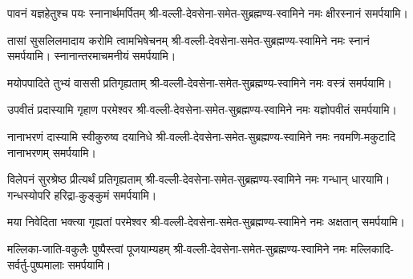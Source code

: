 \begin{center}
{पावनं यज्ञहेतुश्च पयः स्नानार्थमर्पितम्}
\nobreak%
श्री-वल्ली-देवसेना-समेत-सुब्रह्मण्य-स्वामिने
नमः क्षीरस्नानं समर्पयामि।

{तासां सुसलिलमादाय करोमि त्वामभिषेचनम्}
\nobreak%
श्री-वल्ली-देवसेना-समेत-सुब्रह्मण्य-स्वामिने
नमः स्नानं समर्पयामि। स्नानान्तरमाचमनीयं समर्पयामि।

{मयोपपादिते तुभ्यं वाससी प्रतिगृह्यताम्}
\nobreak%
श्री-वल्ली-देवसेना-समेत-सुब्रह्मण्य-स्वामिने
नमः वस्त्रं समर्पयामि।

{उपवीतं प्रदास्यामि गृहाण परमेश्वर}
\nobreak%
श्री-वल्ली-देवसेना-समेत-सुब्रह्मण्य-स्वामिने
नमः यज्ञोपवीतं समर्पयामि।

{नानाभरणं दास्यामि स्वीकुरुष्व दयानिधे}
\nobreak%
श्री-वल्ली-देवसेना-समेत-सुब्रह्मण्य-स्वामिने
नमः नवमणि-मकुटादि नानाभरणम् समर्पयामि।

{विलेपनं सुरश्रेष्ठ प्रीत्यर्थं प्रतिगृह्यताम्}
\nobreak%
श्री-वल्ली-देवसेना-समेत-सुब्रह्मण्य-स्वामिने
नमः गन्धान् धारयामि। गन्धस्योपरि हरिद्रा-कुङ्कुमं समर्पयामि।


{मया निवेदिता भक्त्या गृह्यतां परमेश्वर}
\nobreak%
श्री-वल्ली-देवसेना-समेत-सुब्रह्मण्य-स्वामिने
नमः अक्षतान् समर्पयामि।

{मल्लिका-जाति-वकुलैः पुष्पैस्त्वां पूजयाम्यहम्}
\nobreak%
श्री-वल्ली-देवसेना-समेत-सुब्रह्मण्य-स्वामिने
नमः मल्लिकादि-सर्वर्तु-पुष्पमालाः समर्पयामि।



\end{center}
